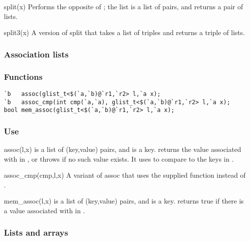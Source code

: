 \begin{defun}{split}{(x)}
Performs the opposite of ; the list  is a list of
pairs, and  returns a pair of lists.
\end{defun}

\begin{defun}{split3}{(x)}
A version of split that takes a list of triples and returns a triple
of lists.
\end{defun}

  
\subsubsection*{Association lists}
\subsubsection*{Functions}
\begin{verbatim}
`b   assoc(glist_t<$(`a,`b)@`r1,`r2> l,`a x);
`b   assoc_cmp(int cmp(`a,`a), glist_t<$(`a,`b)@`r1,`r2> l,`a x);
bool mem_assoc(glist_t<$(`a,`b)@`r1,`r2> l,`a x);
\end{verbatim} %

\subsubsection*{Use}

\begin{defun}{assoc}{(l,x)}
 is a list of (key,value) pairs, and  is a key.
 returns the value associated with  in , or
throws  if no such value exists.  It uses
\code{==} to compare  to the keys in .
\end{defun}

\begin{defun}{assoc_cmp}{(cmp,l,x)}
A variant of assoc that uses the supplied  function instead
of \code{==}.
\end{defun}

\begin{defun}{mem_assoc}{(l,x)}
 is a list of (key,value) pairs, and  is a key.
 returns true if there is a value associated with
 in .
\end{defun}


\subsubsection*{Lists and arrays}

